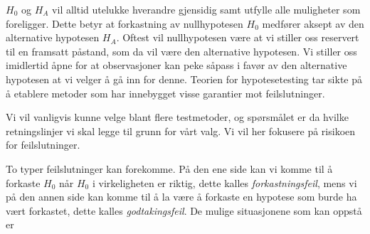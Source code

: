 \begin{center}  \end{center}

\noindent  $H_0$ og $H_A$ vil alltid utelukke hverandre gjensidig samt
utfylle alle muligheter som foreligger. Dette betyr at forkastning
av nullhypotesen $H_0$ medfører aksept av den alternative
hypotesen $H_A$. Oftest vil nullhypotesen være at vi
stiller oss reservert til en framsatt påstand, som da vil være
den alternative hypotesen.
Vi stiller oss imidlertid åpne for at observasjoner 
kan peke såpass i favør av den alternative hypotesen at vi velger
å gå inn for denne. Teorien for hypotesetesting tar sikte på
å etablere metoder som har innebygget visse garantier mot
feilslutninger.

\begin{center}  \end{center}

\noindent Vi vil vanligvis kunne velge blant flere testmetoder, og
spørsmålet er da hvilke retningslinjer vi skal legge til grunn
for vårt valg. Vi vil her fokusere på risikoen for feilslutninger.

 To typer feilslutninger kan forekomme. På den ene
side kan vi komme til å forkaste $H_0$ når $H_0$ i virkeligheten
er riktig, dette kalles {\em forkastningsfeil}, mens vi på den
annen side kan komme til å la være å forkaste en hypotese som
burde ha vært forkastet, dette kalles {\em godtakingsfeil}.
De mulige situasjonene som kan oppstå er

